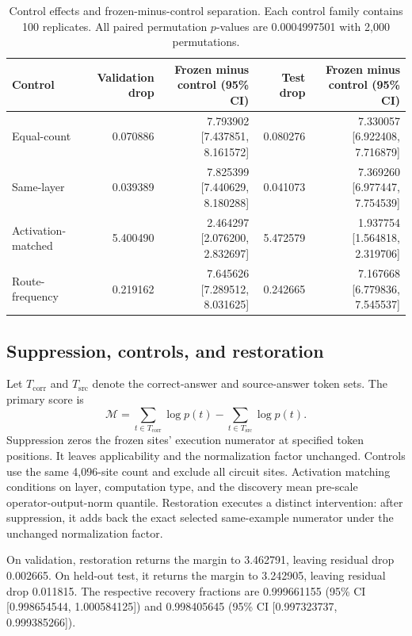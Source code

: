\documentclass{article}
\begin{document}
\begin{table}[!t]
\centering
\caption{Control effects and frozen-minus-control separation. Each control
family contains 100 replicates. All paired permutation \(p\)-values are
0.0004997501 with 2,000 permutations.}
\label{tab:controls}
\scriptsize
\renewcommand{\arraystretch}{0.96}
\begin{tabular}{lrrrr}
\toprule
Control & Validation drop & Frozen minus control (95\% CI) &
Test drop & Frozen minus control (95\% CI)\\
\midrule
Equal-count & 0.070886 & 7.793902 [7.437851, 8.161572] &
0.080276 & 7.330057 [6.922408, 7.716879]\\
Same-layer & 0.039389 & 7.825399 [7.440629, 8.180288] &
0.041073 & 7.369260 [6.977447, 7.754539]\\
Activation-matched & 5.400490 & 2.464297 [2.076200, 2.832697] &
5.472579 & 1.937754 [1.564818, 2.319706]\\
Route-frequency & 0.219162 & 7.645626 [7.289512, 8.031625] &
0.242665 & 7.167668 [6.779836, 7.545537]\\
\bottomrule
\end{tabular}
\end{table}

\subsection{Suppression, controls, and restoration}

Let \(T_{\mathrm{corr}}\) and \(T_{\mathrm{src}}\) denote the correct-answer and
source-answer token sets. The primary score is
\[
\mathcal{M}=\sum_{t\in T_{\mathrm{corr}}}\log p(t)
-\sum_{t\in T_{\mathrm{src}}}\log p(t).
\]
Suppression zeros the frozen sites' execution numerator at specified token
positions. It leaves applicability and the normalization factor unchanged.
Controls use the same 4,096-site count and exclude all circuit sites.
Activation matching conditions on layer, computation type, and the discovery mean
pre-scale operator-output-norm quantile. Restoration executes a distinct
intervention: after suppression, it adds back the exact selected same-example
numerator under the unchanged normalization factor.

On validation, restoration returns the margin to 3.462791, leaving residual
drop 0.002665. On held-out test, it returns the margin to 3.242905, leaving
residual drop 0.011815. The respective recovery fractions are 0.999661155
(95\% CI [0.998654544, 1.000584125]) and 0.998405645
(95\% CI [0.997323737, 0.999385266]).
\end{document}
